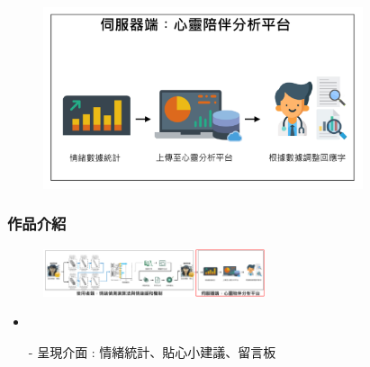 \documentclass[10pt, conference, compsocconf]{beamer}
\begin{document}
\begin{CJK}{UTF8}{}
\begin{frame}
\begin{figure}[!t]
\begin{center}
\includegraphics[width=9.4cm]{./Figures/WEB_intro.pdf}
\end{center}
\end{figure}

\end{frame}



%


\begin{frame}
\frametitle{作品介紹}

\vspace{-3mm}
\begin{figure}[t]
\begin{flushright}
\includegraphics[width=6.5cm]{./Figures/framework_version4_9.pdf}
\end{flushright}
\end{figure}

\vspace{-6mm}
\begin{itemize}
\item {}
\end{itemize}
\begin{itemize}
\item[-]  呈現介面 : 情緒統計、貼心小建議、留言板\\
\end{itemize}
\vspace{-3mm}


\end{frame}
\end{CJK}
\end{document}
